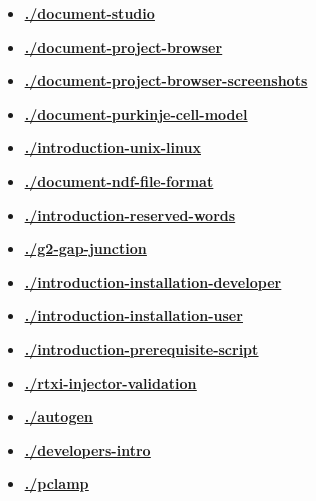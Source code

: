\documentclass[12pt]{article}
\begin{document}
\begin{itemize}
\item \href{.././document-studio/./document-studio.pdf}{\bf \underline{./document-studio}}

\item \href{.././document-project-browser/./document-project-browser.pdf}{\bf \underline{./document-project-browser}}

\item \href{.././document-project-browser-screenshots/./document-project-browser-screenshots.pdf}{\bf \underline{./document-project-browser-screenshots}}

\item \href{.././document-purkinje-cell-model/./document-purkinje-cell-model.pdf}{\bf \underline{./document-purkinje-cell-model}}

\item \href{.././introduction-unix-linux/./introduction-unix-linux.pdf}{\bf \underline{./introduction-unix-linux}}

\item \href{.././document-ndf-file-format/./document-ndf-file-format.pdf}{\bf \underline{./document-ndf-file-format}}

\item \href{.././introduction-reserved-words/./introduction-reserved-words.pdf}{\bf \underline{./introduction-reserved-words}}

\item \href{.././g2-gap-junction/./g2-gap-junction.pdf}{\bf \underline{./g2-gap-junction}}

\item \href{.././introduction-installation-developer/./introduction-installation-developer.pdf}{\bf \underline{./introduction-installation-developer}}

\item \href{.././introduction-installation-user/./introduction-installation-user.pdf}{\bf \underline{./introduction-installation-user}}

\item \href{.././introduction-prerequisite-script/./introduction-prerequisite-script.pdf}{\bf \underline{./introduction-prerequisite-script}}

\item \href{.././rtxi-injector-validation/./rtxi-injector-validation.pdf}{\bf \underline{./rtxi-injector-validation}}

\item \href{.././autogen/./autogen.pdf}{\bf \underline{./autogen}}

\item \href{.././developers-intro/./developers-intro.pdf}{\bf \underline{./developers-intro}}

\item \href{.././pclamp/./pclamp.pdf}{\bf \underline{./pclamp}}


\end{itemize}

\end{document}
